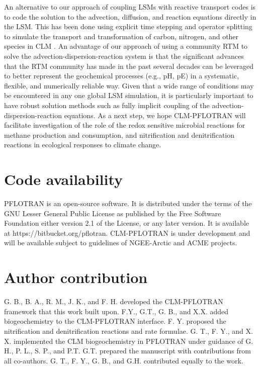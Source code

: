 \documentclass[gmd, manuscript]{copernicus}
\begin{document}
An alternative to our approach of coupling LSMs with reactive transport codes is to code the solution to the advection, diffusion, and reaction equations directly in the LSM. This has been done using explicit time stepping and operator splitting to simulate the transport and transformation of carbon, nitrogen, and other species in CLM \cite{Tang2013b}. An advantage of our approach of using a community RTM to solve the advection-dispersion-reaction system is that the significant advances that the RTM community has made in the past several decades can be leveraged to better represent the geochemical processes (e.g., pH, pE) in a systematic, flexible, and numerically reliable way. Given that a wide range of conditions may be encountered in any one global LSM simulation, it is particularly important to have robust solution methods such as fully implicit coupling of the advection-dispersion-reaction equations. As a next step, we hope CLM-PFLOTRAN will facilitate investigation of the role of the redox sensitive microbial reactions for methane production and consumption, and nitrification and denitrification reactions in ecological responses to climate change.  



%
\section{Code availability}
PFLOTRAN is an open-source software. It is distributed under the terms of the
GNU Lesser General Public License as published by the Free Software Foundation
either version 2.1 of the License, or any later version. It is available at
https://bitbucket.org/pflotran. 
CLM-PFLOTRAN is under development and will be available subject to guidelines of NGEE-Arctic and ACME projects.

\section{Author contribution}
G. B., B. A., R. M., J. K., and F. H. developed the CLM-PFLOTRAN framework that this
work built upon. F.Y., G.T., G. B., and X.X. added biogeochemistry to the CLM-PFLOTRAN
interface. F. Y. proposed the nitrification and denitrification reactions and
rate formulae. G. T., F. Y., and X. X. implemented the CLM
biogeochemistry in PFLOTRAN under guidance of G. H., P. L., S. P., and P.T.
G.T. prepared the manuscript with contributions from all co-authors. 
G. T., F. Y., G. B., and G.H. contributed equally to the work.  
\end{document}
